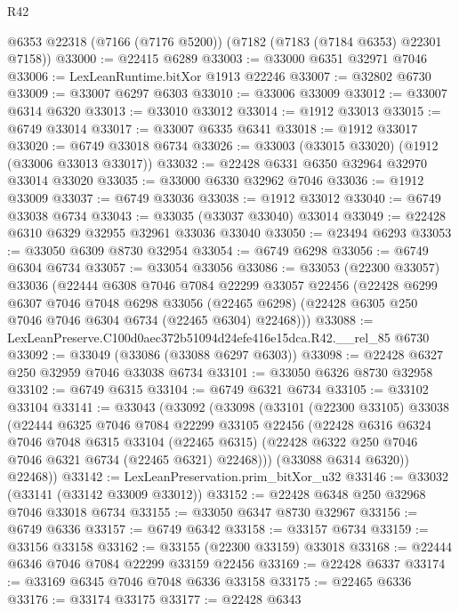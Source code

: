 \begin{lexlean}{R42}
\begin{coremodule}
{    @6353
    @22318
    (@7166 (@7176 @5200))
    (@7182 (@7183 (@7184 @6353) @22301 @7158))
@33000 := @22415 @6289
@33003 := @33000 @6351 @32971 @7046
@33006 := LexLeanRuntime.bitXor @1913 @22246
@33007 := @32802 @6730
@33009 := @33007 @6297 @6303
@33010 := @33006 @33009
@33012 := @33007 @6314 @6320
@33013 := @33010 @33012
@33014 := @1912 @33013
@33015 := @6749 @33014
@33017 := @33007 @6335 @6341
@33018 := @1912 @33017
@33020 := @6749 @33018 @6734
@33026 := @33003 (@33015 @33020) (@1912 (@33006 @33013 @33017))
@33032 := @22428 @6331 @6350 @32964 @32970 @33014 @33020
@33035 := @33000 @6330 @32962 @7046
@33036 := @1912 @33009
@33037 := @6749 @33036
@33038 := @1912 @33012
@33040 := @6749 @33038 @6734
@33043 := @33035 (@33037 @33040) @33014
@33049 := @22428 @6310 @6329 @32955 @32961 @33036 @33040
@33050 := @23494 @6293
@33053 := @33050 @6309 @8730 @32954
@33054 := @6749 @6298
@33056 := @6749 @6304 @6734
@33057 := @33054 @33056
@33086 := @33053
    (@22300 @33057)
    @33036
    (@22444
      @6308
      @7046
      @7084
      @22299
      @33057
      @22456
      (@22428
        @6299
        @6307
        @7046
        @7048
        @6298
        @33056
        (@22465 @6298)
        (@22428 @6305 @250 @7046 @7046 @6304 @6734 (@22465 @6304) @22468)))
@33088 := LexLeanPreserve.C100d0aec372b51094d24efe416e15dca.R42.__rel_85 @6730
@33092 := @33049 (@33086 (@33088 @6297 @6303))
@33098 := @22428 @6327 @250 @32959 @7046 @33038 @6734
@33101 := @33050 @6326 @8730 @32958
@33102 := @6749 @6315
@33104 := @6749 @6321 @6734
@33105 := @33102 @33104
@33141 := @33043
    (@33092
      (@33098
        (@33101
          (@22300 @33105)
          @33038
          (@22444
            @6325
            @7046
            @7084
            @22299
            @33105
            @22456
            (@22428
              @6316
              @6324
              @7046
              @7048
              @6315
              @33104
              (@22465 @6315)
              (@22428 @6322 @250 @7046 @7046 @6321 @6734 (@22465 @6321) @22468)))
          (@33088 @6314 @6320))
        @22468))
@33142 := LexLeanPreservation.prim_bitXor_u32
@33146 := @33032 (@33141 (@33142 @33009 @33012))
@33152 := @22428 @6348 @250 @32968 @7046 @33018 @6734
@33155 := @33050 @6347 @8730 @32967
@33156 := @6749 @6336
@33157 := @6749 @6342
@33158 := @33157 @6734
@33159 := @33156 @33158
@33162 := @33155 (@22300 @33159) @33018
@33168 := @22444 @6346 @7046 @7084 @22299 @33159 @22456
@33169 := @22428 @6337
@33174 := @33169 @6345 @7046 @7048 @6336 @33158
@33175 := @22465 @6336
@33176 := @33174 @33175
@33177 := @22428 @6343
}
\end{coremodule}
\end{lexlean}
